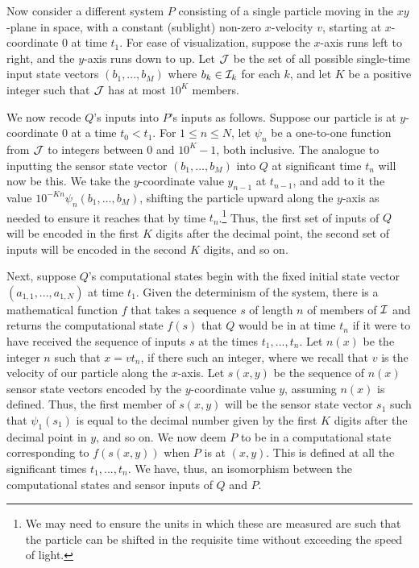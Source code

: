 Now consider a different system $P$ consisting of a single particle moving in the $xy$-plane in space, with a constant 
(sublight) non-zero $x$-velocity $v$, starting at $x$-coordinate $0$ at time $t_1$. For ease of visualization, suppose the $x$-axis
runs left to right, and the $y$-axis runs down to up.
Let $\mathcal J$ be the set of all possible
single-time input state vectors $(b_1,...,b_M)$ where $b_k \in\mathcal I_k$ for each $k$, and let $K$ be a positive integer such
that $\mathcal J$ has at most $10^K$ members. 

We now recode $Q$'s inputs into $P$'s inputs as follows. Suppose our particle is at $y$-coordinate $0$ at a time $t_0<t_1$. 
For $1\le n\le N$, let $\psi_n$ be a one-to-one function from $\mathcal J$ to integers between $0$ and $10^K-1$, both inclusive. The analogue 
to inputting the sensor state vector $(b_1,...,b_M)$ into $Q$ at significant time $t_n$ will now be this. We take
the $y$-coordinate value $y_{n-1}$ at $t_{n-1}$, and add to it the value $10^{-Kn} \psi_n(b_1,...,b_M)$, shifting the particle
upward along the $y$-axis as needed to ensure it reaches that by time $t_n$.\footnote{We may need to ensure the units in which
these are measured are such that the particle can be shifted in the requisite time without exceeding the speed of light.} Thus, 
the first set of inputs of $Q$ will be encoded in the first $K$ digits after the decimal point, the second set of inputs
will be encoded in the second $K$ digits, and so on.

Next, suppose $Q$'s computational states begin with the fixed initial state vector $(a_{1,1},...,a_{1,N})$ at time $t_1$. Given 
the determinism of the system, there is a mathematical function $f$ that takes a sequence $s$ of length $n$ of members of $\mathcal I$ 
and returns the computational state $f(s)$ that $Q$ would be in at time $t_n$ if it were to have received the sequence of inputs $s$ 
at the times $t_1,...,t_n$. Let $n(x)$ be the integer $n$ such that $x=v t_n$, if there such an integer, where we recall that
$v$ is the velocity of our particle along the $x$-axis. Let $s(x,y)$ be the sequence of $n(x)$ sensor state vectors encoded 
by the $y$-coordinate value $y$, assuming $n(x)$ is defined. Thus, the first member of $s(x,y)$ will be the sensor state vector
$s_1$ such that $\psi_1(s_1)$ is equal to the decimal number given by the first $K$ digits after the decimal point in $y$, and so on.
We now deem $P$ to be in a computational state corresponding to $f(s(x,y))$ when $P$ is at $(x,y)$. This is defined at all the
significant times $t_1,...,t_n$. We have, thus, an isomorphism between the computational states and sensor inputs of $Q$ and $P$.

